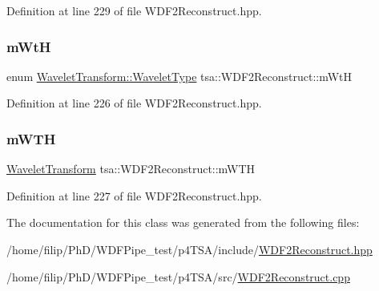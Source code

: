 Definition at line 229 of file W\+D\+F2\+Reconstruct.\+hpp.

\mbox{\label{classtsa_1_1_w_d_f2_reconstruct_a4950183a20397f47d014e1abc9271f78}} 
\subsubsection{\texorpdfstring{m\+WtH}{mWtH}}
{\footnotesize\ttfamily enum \hyperlink{classtsa_1_1_wavelet_transform_a5a529de70e0004333fcf23b9cca88ce7}{Wavelet\+Transform\+::\+Wavelet\+Type} tsa\+::\+W\+D\+F2\+Reconstruct\+::m\+WtH\hspace{0.3cm}{\ttfamily [private]}}



Definition at line 226 of file W\+D\+F2\+Reconstruct.\+hpp.

\mbox{\label{classtsa_1_1_w_d_f2_reconstruct_af77219bc01d5cb4f609484186cbae5ad}} 
\subsubsection{\texorpdfstring{m\+W\+TH}{mWTH}}
{\footnotesize\ttfamily \hyperlink{classtsa_1_1_wavelet_transform}{Wavelet\+Transform} tsa\+::\+W\+D\+F2\+Reconstruct\+::m\+W\+TH\hspace{0.3cm}{\ttfamily [private]}}



Definition at line 227 of file W\+D\+F2\+Reconstruct.\+hpp.



The documentation for this class was generated from the following files\+:\begin{DoxyCompactItemize}
\item 
/home/filip/\+Ph\+D/\+W\+D\+F\+Pipe\+\_\+test/p4\+T\+S\+A/include/\hyperlink{_w_d_f2_reconstruct_8hpp}{W\+D\+F2\+Reconstruct.\+hpp}\item 
/home/filip/\+Ph\+D/\+W\+D\+F\+Pipe\+\_\+test/p4\+T\+S\+A/src/\hyperlink{_w_d_f2_reconstruct_8cpp}{W\+D\+F2\+Reconstruct.\+cpp}\end{DoxyCompactItemize}
